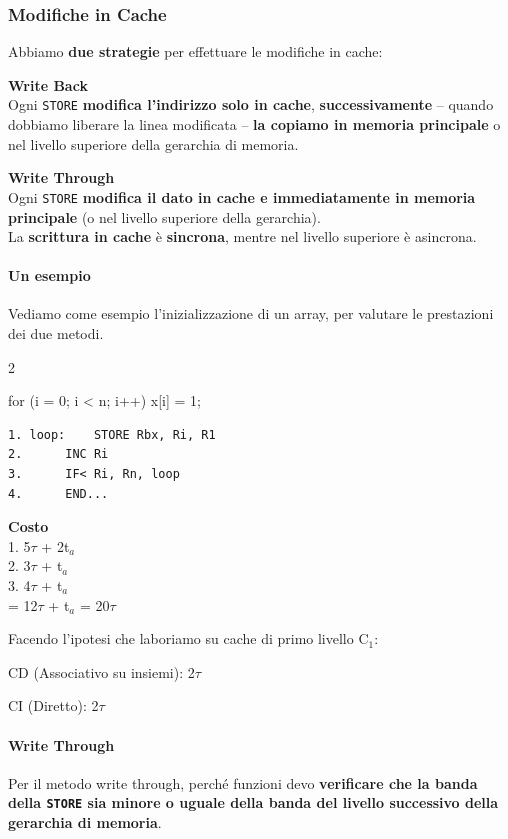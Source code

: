 \documentclass[10pt]{report}
\begin{document}
\subsubsection{Modifiche in Cache}
Abbiamo \textbf{due strategie} per effettuare le modifiche in cache:
\begin{list}{}{}
	\item \textbf{Write Back}\\
	Ogni \texttt{STORE} \textbf{modifica l'indirizzo solo in cache}, \textbf{successivamente} -- quando dobbiamo liberare la linea modificata -- \textbf{la copiamo in memoria principale} o nel livello superiore della gerarchia di memoria.
	\item \textbf{Write Through}\\
	Ogni \texttt{STORE} \textbf{modifica il dato in cache e immediatamente in memoria principale} (o nel livello superiore della gerarchia).\\
	La \textbf{scrittura in cache} è \textbf{sincrona}, mentre nel livello superiore è asincrona.
\end{list}
\pagebreak
\paragraph{Un esempio} Vediamo come esempio l'inizializzazione di un array, per valutare le prestazioni dei due metodi.
\begin{multicols}{2}
\begin{C}
for (i = 0; i < n; i++) x[i] = 1;
\end{C}
\begin{lstlisting}
1. loop:	STORE Rbx, Ri, R1
2.		INC Ri
3.		IF< Ri, Rn, loop
4.		END...
\end{lstlisting}
\columnbreak
\textbf{Costo}\\
	1. 5$\tau$ + 2t$_a$\\
	2. 3$\tau$ + t$_a$\\
	3. 4$\tau$ + t$_a$\\
	= 12$\tau$ + t$_a$ = 20$\tau$
\end{multicols}
\begin{list}{}{Facendo l'ipotesi che laboriamo su cache di primo livello C$_1$:}
	\item CD (Associativo su insiemi): 2$\tau$
	\item CI (Diretto): 2$\tau$
\end{list}
\paragraph{Write Through} Per il metodo write through, perché funzioni devo \textbf{verificare che la banda della \texttt{STORE} sia minore o uguale della banda del livello successivo della gerarchia di memoria}.
\end{document}
